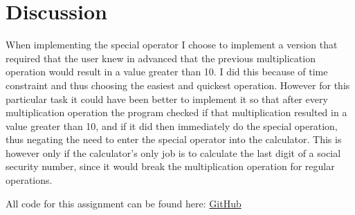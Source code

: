 \documentclass[a4paper,11pt]{article}
\begin{document}
\section*{Discussion}
When implementing the special operator I choose to implement a version that required that the
user knew in advanced that the previous multiplication operation would result in a value
greater than 10. I did this because of time constraint and thus choosing the easiest and
quickest operation. However for this particular task it could have been better to implement
it so that after every multiplication operation the program checked if that multiplication
resulted in a value greater than 10, and if it did then immediately do the special operation,
thus negating the need to enter the special operator into the calculator. This is however only
if the calculator's only job is to calculate the last digit of a social security number, since
it would break the multiplication operation for regular operations.

All code for this assignment can be found here: \href{https://github.com/adrian-jonsson-sjoedin/ID1021-AlgoData/tree/main/Tasks/HP35/HP35Calculator/src}{GitHub}
\end{document}
